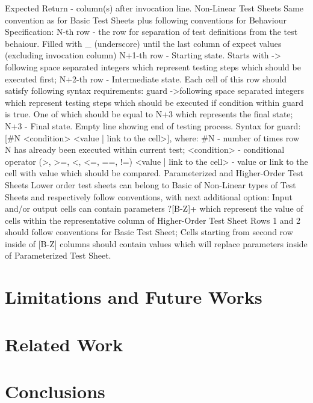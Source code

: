 \documentclass{llncs}
\begin{document}
Expected Return - column(s) after invocation line.
 Non-Linear Test Sheets
Same convention as for Basic Test Sheets plus following conventions for Behaviour Specification:
N-th row - the row for separation of test definitions from the test behaiour. Filled with _ (underscore) until the last column of expect values (excluding invocation column)
N+1-th row - Starting state. Starts with -> following space separated integers which represent testing steps which should be executed first;
N+2-th row - Intermediate state. Each cell of this row should satisfy following syntax requirements: guard ->following space separated integers which represent testing steps which should be executed if condition within guard is true. One of which should be equal to N+3 which represents the final state;
N+3 - Final state. Empty line showing end of testing process.
Syntax for guard: [#N <condition> <value | link to the cell>], where:
#N - number of times row N has already been executed within current test;
<condition> - conditional operator (>, >=, <, <=, ==, !=)
<value | link to the cell> - value or link to the cell with value which should be compared.
 Parameterized and Higher-Order Test Sheets
Lower order test sheets can belong to Basic of Non-Linear types of Test Sheets and respectively follow conventions, with next additional option:
Input and/or output cells can contain parameters ?[B-Z]+ which represent the value of cells within the representative column of Higher-Order Test Sheet
Rows 1 and 2 should follow conventions for Basic Test Sheet;
Cells starting from second row inside of [B-Z] columns should contain values which will replace parameters inside of Parameterized Test Sheet.


\section{Limitations and Future Works}
\label{sec:limitations_and_future_work}

\section{Related Work}
\label{sec:related_work}

\section{Conclusions}
\label{sec:conclusion}



\end{document}

